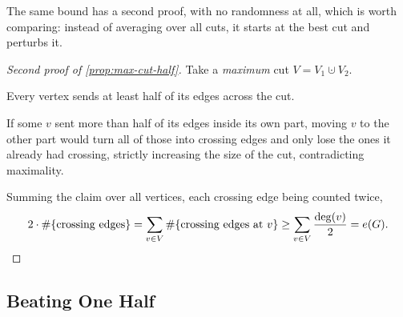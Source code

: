 The same bound has a second proof, with no randomness at all, which is worth comparing: instead of averaging over all cuts, it starts at the best cut and perturbs it.

\begin{proof}[Second proof of \autoref{prop:max-cut-half}]
    Take a \emph{maximum} cut \(V = V_1 \cupdot V_2\).

    \begin{claim}
        Every vertex sends at least half of its edges across the cut.
    \end{claim}
    \begin{subproof}
        If some \(v\) sent more than half of its edges inside its own part, moving \(v\) to the other part would turn all of those into crossing edges and only lose the ones it already had crossing, strictly increasing the size of the cut, contradicting maximality.
    \end{subproof}
    \begin{center}
    \end{center}
    Summing the claim over all vertices, each crossing edge being counted twice,
    \[
        2 \cdot \#\{\text{crossing edges}\} = \sum_{v \in V} \#\{\text{crossing edges at } v\} \ge \sum_{v \in V} \frac{\deg(v)}{2} = e(G). \qedhere
    \]
\end{proof}

\subsection{Beating One Half}

